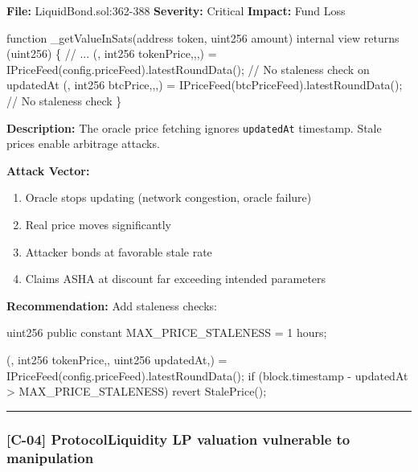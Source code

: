 \documentclass[
]{article}
\newenvironment{Shaded}{}{}
\newcommand{\NormalTok}[1]{#1}
\providecommand{\tightlist}{%
  \setlength{\itemsep}{0pt}\setlength{\parskip}{0pt}}
\begin{document}
\textbf{File:} LiquidBond.sol:362-388 \textbf{Severity:} Critical
\textbf{Impact:} Fund Loss

\begin{Shaded}
\begin{Highlighting}[]
\NormalTok{function \_getValueInSats(address token, uint256 amount) internal view returns (uint256) \{}
\NormalTok{    // ...}
\NormalTok{    (, int256 tokenPrice,,,) = IPriceFeed(config.priceFeed).latestRoundData();}
\NormalTok{    // No staleness check on updatedAt}
\NormalTok{    (, int256 btcPrice,,,) = IPriceFeed(btcPriceFeed).latestRoundData();}
\NormalTok{    // No staleness check}
\NormalTok{\}}
\end{Highlighting}
\end{Shaded}

\textbf{Description:} The oracle price fetching ignores
\texttt{updatedAt} timestamp. Stale prices enable arbitrage attacks.

\textbf{Attack Vector:}

\begin{enumerate}
\def\labelenumi{\arabic{enumi}.}
\tightlist
\item
  Oracle stops updating (network congestion, oracle failure)
\item
  Real price moves significantly
\item
  Attacker bonds at favorable stale rate
\item
  Claims ASHA at discount far exceeding intended parameters
\end{enumerate}

\textbf{Recommendation:} Add staleness checks:

\begin{Shaded}
\begin{Highlighting}[]
\NormalTok{uint256 public constant MAX\_PRICE\_STALENESS = 1 hours;}

\NormalTok{(, int256 tokenPrice,, uint256 updatedAt,) = IPriceFeed(config.priceFeed).latestRoundData();}
\NormalTok{if (block.timestamp {-} updatedAt \textgreater{} MAX\_PRICE\_STALENESS) revert StalePrice();}
\end{Highlighting}
\end{Shaded}

\begin{center}\rule{0.5\linewidth}{0.5pt}\end{center}

\subsubsection{{[}C-04{]} ProtocolLiquidity LP valuation vulnerable to
manipulation}\label{c-04-protocolliquidity-lp-valuation-vulnerable-to-manipulation}
\end{document}

